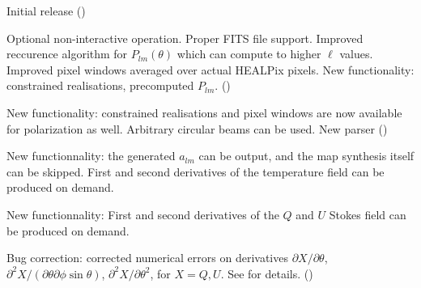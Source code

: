 \begin{release}
  \begin{relist}
    \item Initial release ()
    \item Optional non-interactive operation. Proper FITS file
    support. Improved reccurence algorithm for $P_{lm}(\theta)$ which can compute to higher $\ell$ values. Improved pixel windows averaged over
    actual HEALPix pixels. New functionality: constrained realisations, precomputed
    $P_{lm}$. ()
    \item New functionality: constrained realisations and pixel
    windows are now available for polarization as well. Arbitrary
    circular beams can be used. New parser ()
    \item New functionnality: the generated $a_{lm}$ can be output, and the map
    synthesis itself can be skipped. First and second derivatives of the
    temperature field can be produced on demand.
    \item New functionnality: First and second derivatives of the
    $Q$ and $U$ Stokes field can be produced on demand.
    \item Bug correction: corrected numerical errors on derivatives 
$\partial X/\partial\theta$, 
$\partial^2 X/(\partial\theta\partial\phi\sin\theta)$, 
$\partial^2 X/\partial \theta^2$, 
for $X=Q,U$. See  for details.
  ()
  \end{relist}
\end{release}

